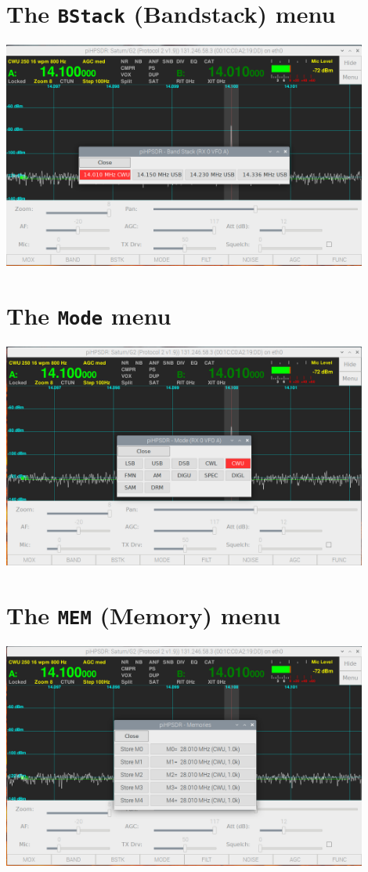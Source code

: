 \documentclass[12pt]{book}
\begin{document}
\section{The  \texttt{BStack} (Bandstack) menu}
\begin{center}
\includegraphics[width=12cm]{BandstackMenu.png}
\end{center}
 
\section{The \texttt{Mode} menu}
\begin{center}
\includegraphics[width=12cm]{ModeMenu.png}
\end{center}

\section{The \texttt{MEM} (Memory) menu}
\begin{center}
\includegraphics[width=12cm]{MemMenu.png}
\end{center}
 
\end{document}
